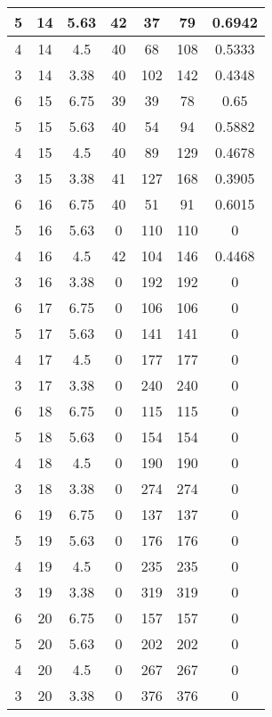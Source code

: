 \documentclass[letterpaper, 12pt]{article}
\begin{document}
\begin{longtable}{|c|c|c|c|c|c|c|}
\hline
5 & 14 & 5.63 & 42 & 37 & 79 & 0.6942 \\
\hline
4 & 14 & 4.5 & 40 & 68 & 108 & 0.5333 \\
\hline
3 & 14 & 3.38 & 40 & 102 & 142 & 0.4348 \\
\hline
6 & 15 & 6.75 & 39 & 39 & 78 & 0.65 \\
\hline
5 & 15 & 5.63 & 40 & 54 & 94 & 0.5882 \\
\hline
4 & 15 & 4.5 & 40 & 89 & 129 & 0.4678 \\
\hline
3 & 15 & 3.38 & 41 & 127 & 168 & 0.3905 \\
\hline
6 & 16 & 6.75 & 40 & 51 & 91 & 0.6015 \\
\hline
5 & 16 & 5.63 & 0 & 110 & 110 & 0 \\
\hline
4 & 16 & 4.5 & 42 & 104 & 146 & 0.4468 \\
\hline
3 & 16 & 3.38 & 0 & 192 & 192 & 0 \\
\hline
6 & 17 & 6.75 & 0 & 106 & 106 & 0 \\
\hline
5 & 17 & 5.63 & 0 & 141 & 141 & 0 \\
\hline
4 & 17 & 4.5 & 0 & 177 & 177 & 0 \\
\hline
3 & 17 & 3.38 & 0 & 240 & 240 & 0 \\
\hline
6 & 18 & 6.75 & 0 & 115 & 115 & 0 \\
\hline
5 & 18 & 5.63 & 0 & 154 & 154 & 0 \\
\hline
4 & 18 & 4.5 & 0 & 190 & 190 & 0 \\
\hline
3 & 18 & 3.38 & 0 & 274 & 274 & 0 \\
\hline
6 & 19 & 6.75 & 0 & 137 & 137 & 0 \\
\hline
5 & 19 & 5.63 & 0 & 176 & 176 & 0 \\
\hline
4 & 19 & 4.5 & 0 & 235 & 235 & 0 \\
\hline
3 & 19 & 3.38 & 0 & 319 & 319 & 0 \\
\hline
6 & 20 & 6.75 & 0 & 157 & 157 & 0 \\
\hline
5 & 20 & 5.63 & 0 & 202 & 202 & 0 \\
\hline
4 & 20 & 4.5 & 0 & 267 & 267 & 0 \\
\hline
3 & 20 & 3.38 & 0 & 376 & 376 & 0 \\
\hline
\end{longtable}
\end{document}
